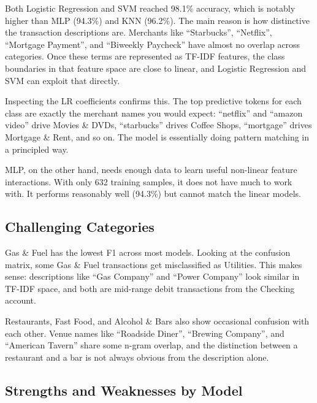 \documentclass[11pt]{article}
\begin{document}
Both Logistic Regression and SVM reached 98.1\% accuracy, which is notably higher than MLP (94.3\%) and KNN (96.2\%). The main reason is how distinctive the transaction descriptions are. Merchants like ``Starbucks'', ``Netflix'', ``Mortgage Payment'', and ``Biweekly Paycheck'' have almost no overlap across categories. Once these terms are represented as TF-IDF features, the class boundaries in that feature space are close to linear, and Logistic Regression and SVM can exploit that directly.

Inspecting the LR coefficients confirms this. The top predictive tokens for each class are exactly the merchant names you would expect: ``netflix'' and ``amazon video'' drive Movies \& DVDs, ``starbucks'' drives Coffee Shops, ``mortgage'' drives Mortgage \& Rent, and so on. The model is essentially doing pattern matching in a principled way.

MLP, on the other hand, needs enough data to learn useful non-linear feature interactions. With only 632 training samples, it does not have much to work with. It performs reasonably well (94.3\%) but cannot match the linear models.

\subsection{Challenging Categories}

Gas \& Fuel has the lowest F1 across most models. Looking at the confusion matrix, some Gas \& Fuel transactions get misclassified as Utilities. This makes sense: descriptions like ``Gas Company'' and ``Power Company'' look similar in TF-IDF space, and both are mid-range debit transactions from the Checking account.

Restaurants, Fast Food, and Alcohol \& Bars also show occasional confusion with each other. Venue names like ``Roadside Diner'', ``Brewing Company'', and ``American Tavern'' share some n-gram overlap, and the distinction between a restaurant and a bar is not always obvious from the description alone.

\subsection{Strengths and Weaknesses by Model}
\end{document}
